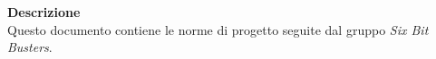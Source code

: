 \begin{titlepage}
\begin{center}
	\large \textbf{Descrizione} \\
	Questo documento contiene le norme di progetto seguite dal gruppo \textit{Six Bit Busters}.
	
	
	
	\end{center}
\end{titlepage}
